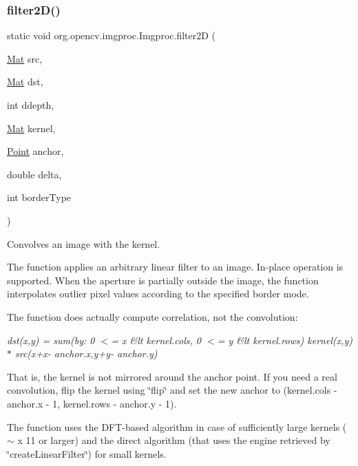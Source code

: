 \subsubsection{\texorpdfstring{filter2\+D()}{filter2D()}\hspace{0.1cm}{\footnotesize\ttfamily [1/3]}}
{\footnotesize\ttfamily static void org.\+opencv.\+imgproc.\+Imgproc.\+filter2D (\begin{DoxyParamCaption}\item[{\mbox{\hyperlink{classorg_1_1opencv_1_1core_1_1_mat}{Mat}}}]{src,  }\item[{\mbox{\hyperlink{classorg_1_1opencv_1_1core_1_1_mat}{Mat}}}]{dst,  }\item[{int}]{ddepth,  }\item[{\mbox{\hyperlink{classorg_1_1opencv_1_1core_1_1_mat}{Mat}}}]{kernel,  }\item[{\mbox{\hyperlink{classorg_1_1opencv_1_1core_1_1_point}{Point}}}]{anchor,  }\item[{double}]{delta,  }\item[{int}]{border\+Type }\end{DoxyParamCaption})\hspace{0.3cm}{\ttfamily [static]}}

Convolves an image with the kernel.

The function applies an arbitrary linear filter to an image. In-\/place operation is supported. When the aperture is partially outside the image, the function interpolates outlier pixel values according to the specified border mode.

The function does actually compute correlation, not the convolution\+:

{\itshape dst(x,y) = sum(by\+: 0 $<$= x\textquotesingle{} \&lt kernel.\+cols, 0 $<$= y\textquotesingle{} \&lt kernel.\+rows) kernel(x\textquotesingle{},y\textquotesingle{})$\ast$ src(x+x\textquotesingle{}-\/ anchor.\+x,y+y\textquotesingle{}-\/ anchor.\+y)}

That is, the kernel is not mirrored around the anchor point. If you need a real convolution, flip the kernel using \char`\"{}flip\char`\"{} and set the new anchor to {\ttfamily (kernel.\+cols -\/ anchor.\+x -\/ 1, kernel.\+rows -\/ anchor.\+y -\/ 1)}.

The function uses the D\+F\+T-\/based algorithm in case of sufficiently large kernels ($\sim${ x 11} or larger) and the direct algorithm (that uses the engine retrieved by \char`\"{}create\+Linear\+Filter\char`\"{}) for small kernels.


